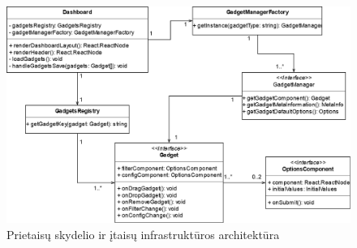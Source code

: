 \documentclass{VUMIFPSbakalaurinis}
\begin{document}
\begin{figure}[H]
    \centering
    \includegraphics[scale=0.45]{images/gadgets}
    \caption{Prietaisų skydelio ir įtaisų infrastruktūros architektūra} 
\end{figure}
\end{document}
